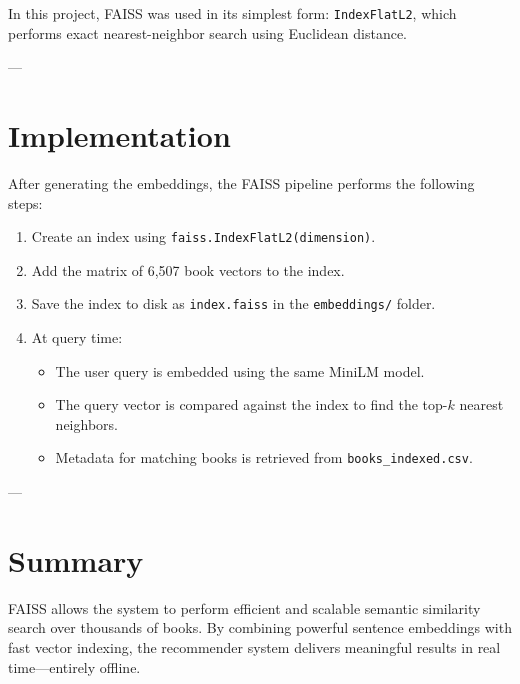 In this project, FAISS was used in its simplest form: \texttt{IndexFlatL2}, which performs exact nearest-neighbor search using Euclidean distance.

---

\section{Implementation}
\label{sec:similarity-implementation}

After generating the embeddings, the FAISS pipeline performs the following steps:

\begin{enumerate}
    \item Create an index using \texttt{faiss.IndexFlatL2(dimension)}.
    \item Add the matrix of 6,507 book vectors to the index.
    \item Save the index to disk as \texttt{index.faiss} in the \texttt{embeddings/} folder.
    \item At query time:
    \begin{itemize}
        \item The user query is embedded using the same MiniLM model.
        \item The query vector is compared against the index to find the top-$k$ nearest neighbors.
        \item Metadata for matching books is retrieved from \texttt{books\_indexed.csv}.
    \end{itemize}
\end{enumerate}

---

\section{Summary}
\label{sec:similarity-summary}

FAISS allows the system to perform efficient and scalable semantic similarity search over thousands of books. 
By combining powerful sentence embeddings with fast vector indexing, the recommender system delivers meaningful results in real time—entirely offline.
